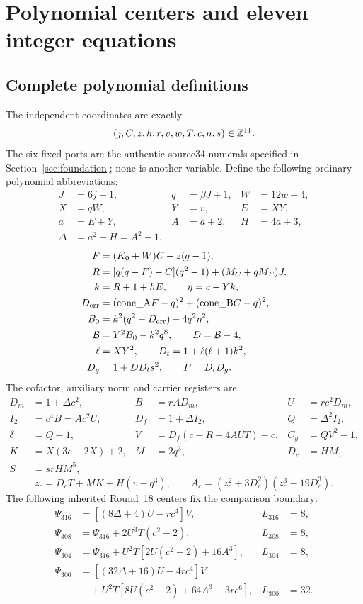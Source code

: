 \section{Polynomial centers and eleven integer equations}
\label{sec:scalar}
\subsection{Complete polynomial definitions}
The independent coordinates are exactly
\[
 (j,C,z,h,r,v,w,T,c,n,s)\in\mathbb Z^{11}.
\]
The six fixed ports are the authentic source34 numerals specified in
Section~\ref{sec:foundation}; none is another variable. Define the following
ordinary polynomial abbreviations:
\begin{align*}
 J&=6j+1,& q&=\beta J+1,& W&=12w+4,\\
 X&=qW,&Y&=v,&E&=XY,\\
 a&=E+Y,&A&=a+2,&H&=4a+3,\\
 \Delta&=a^2+H=A^2-1,&&&
\end{align*}
\begin{align*}
 F&=(K_0+W)C-z(q-1),\\
 R&=[q(q-F)-C](q^2-1)+(M_C+qM_F)J,\\
 k&=R+1+hE,\qquad \eta=c-Yk,\\
 D_{\rm err}&=(\mathrm{cone\_A}F-q)^2+(\mathrm{cone\_B}C-q)^2,\\
 B_0&=k^2(q^2-D_{\rm err})-4q^2\eta^2,\\
 \mathcal B&=Y^2B_0-k^2q^8,\qquad D=\mathcal B-4,\\
 \ell&=XY^2,\qquad D_t=1+\ell(\ell+1)k^2,\\
 D_g&=1+DD_ts^2,\qquad P=D_tD_g.
\end{align*}
The cofactor, auxiliary norm and carrier registers are
\begin{align*}
 D_m&=1+\Delta c^2,& B&=rAD_m,& U&=rc^2D_m,\\
 I_2&=c^4B=Ac^2U,& D_f&=1+\Delta I_2,& Q&=\Delta^2I_2,\\
 \delta&=Q-1,& V&=D_f(c-R+4AUT)-c,& C_y&=QV^2-1,\\
 K&=X(3c-2X)+2,&M&=2q^3,&D_c&=HM,\\
 S&=srHM^5,&&&
\end{align*}
\[
 z_c=D_cT+MK+H(v-q^3),\qquad
 A_c=(z_c^2+3D_c^2)(z_c^3-19D_c^3).
\]
The following inherited Round~18 centers fix the comparison boundary:
\begin{align*}
 \Psi_{316}&=[(8\Delta+4)U-rc^4]V,&L_{316}&=8,\\
 \Psi_{308}&=\Psi_{316}+2U^3T(c^2-2),&L_{308}&=8,\\
 \Psi_{304}&=\Psi_{316}+U^2T[2U(c^2-2)+16A^3],&L_{304}&=8,\\
 \Psi_{300}&=[(32\Delta+16)U-4rc^4]V&&\\
 &\quad+U^2T[8U(c^2-2)+64A^3+3rc^6],&L_{300}&=32.
\end{align*}
